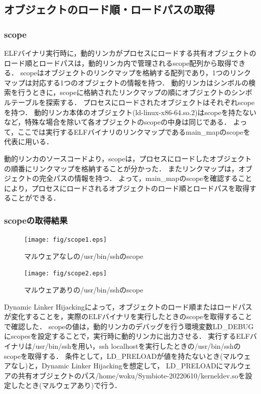 \documentclass[submit,techreq,noauthor]{eco}	%
\begin{document}
\subsection{オブジェクトのロード順・ロードパスの取得}
\subsubsection{scope}
ELFバイナリ実行時に，動的リンカがプロセスにロードする共有オブジェクトのロード順とロードパスは，動的リンカ内で管理されるscope配列から取得できる．
scopeはオブジェクトのリンクマップを格納する配列であり，1つのリンクマップは対応する1つのオブジェクトの情報を持つ．
動的リンカはシンボルの検索を行うときに，scopeに格納されたリンクマップの順にオブジェクトのシンボルテーブルを探索する．
プロセスにロードされたオブジェクトはそれぞれscopeを持つ．
動的リンカ本体のオブジェクト(ld-linux-x86-64.so.2)はscopeを持たないなど，特殊な場合を除いて各オブジェクトのscopeの中身は同じである．
よって，ここでは実行するELFバイナリのリンクマップであるmain\_mapのscopeを代表に用いる．

動的リンカのソースコードより，scopeは，プロセスにロードしたオブジェクトの順番にリンクマップを格納することが分かった．
またリンクマップは，オブジェクトの完全パスの情報を持つ．
よって，main\_mapのscopeを確認することにより，プロセスにロードされるオブジェクトのロード順とロードパスを取得することができる．\\

\subsubsection{scopeの取得結果}

\begin{figure}[t]
	\centering
  \texttt{[image: fig/scope1.eps]}
	\caption{マルウェアなしの/usr/bin/sshのscope}
	\label{fig:scope}
\end{figure}

\begin{figure}[t]
	\centering
  \texttt{[image: fig/scope2.eps]}
	\caption{マルウェアありの/usr/bin/sshのscope}
	\label{fig:scope-malware}
\end{figure}

Dynamic Linker Hijackingによって，オブジェクトのロード順またはロードパスが変化することを，実際のELFバイナリを実行したときのscopeを取得することで確認した．
scopeの値は，動的リンカのデバッグを行う環境変数LD\_DEBUGにscopesを設定することで，実行時に動的リンカに出力させる．
実行するELFバイナリは/usr/bin/sshを用い，ssh localhostを実行したときの/usr/bin/sshのscopeを取得する．
条件として，LD\_PRELOADが値を持たないとき(マルウェアなし)と，Dynamic Linker Hijackingを想定して，
LD\_PRELOADにマルウェアの共有オブジェクトのパス/home/woku/Symbiote-20220610/kerneldev.soを設定したとき(マルウェアあり)で行う．
\end{document}
